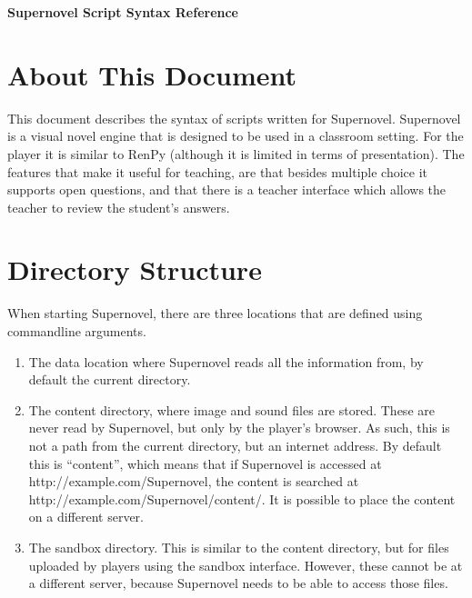 \documentclass{article}
\begin{document}
\noindent\textbf{\Large Supernovel Script Syntax Reference}

\tableofcontents

\tableofcontents

\section{About This Document}
This document describes the syntax of scripts written for Supernovel.
Supernovel is a visual novel engine that is designed to be used in a classroom
setting. For the player it is similar to RenPy (although it is limited in terms
of presentation). The features that make it useful for teaching, are that
besides multiple choice it supports open questions, and that there is a teacher
interface which allows the teacher to review the student's answers.

\section{Directory Structure}
When starting Supernovel, there are three locations that are defined using
commandline arguments.
\begin{enumerate}
	\item The data location where Supernovel reads all the information
		from, by default the current directory. 

	\item The content directory, where image and sound files are stored.
		These are never read by Supernovel, but only by the player's
		browser. As such, this is not a path from the current
		directory, but an internet address. By default this is
		``content'', which means that if Supernovel is accessed at
		http://example.com/Supernovel, the content is searched at
		http://example.com/Supernovel/content/. It is possible to place
		the content on a different server.

	\item The sandbox directory. This is similar to the content directory,
		but for files uploaded by players using the sandbox interface.
		However, these cannot be at a different server, because
		Supernovel needs to be able to access those files.
\end{enumerate}
\end{document}
